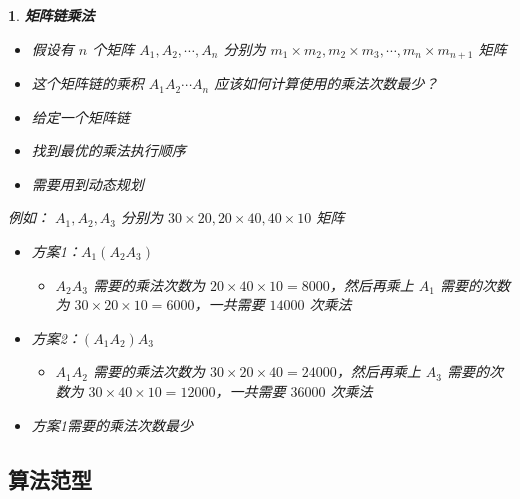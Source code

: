 \documentclass[UTF8]{report}
\theoremstyle{MyLineTheoremStyle} %
\theoremstyle{MyBlockTheoremStyle} %
\theoremstyle{MySubsubsectionStyle} %
\newtheorem{definition}{}
\begin{document}
\begin{definition}
    \textbf{矩阵链乘法}
    \begin{itemize}
        \item 假设有 $n$ 个矩阵 $A_1, A_2, \cdots, A_n$ 分别为 $m_1 × m_2, m_2 × m_3, \cdots, m_n × m_{n+1}$ 矩阵
        \item 这个矩阵链的乘积 $A_1 A_2 \cdots A_n$ 应该如何计算使用的乘法次数最少？
        \item 给定一个矩阵链
        \item 找到最优的乘法执行顺序
        \item 需要用到动态规划
    \end{itemize}

    例如： $A_1, A_2, A_3$ 分别为 $30 × 20, 20 × 40, 40 × 10$ 矩阵
    \begin{itemize}
        \item 方案1：$A_1 (A_2 A_3)$
        \begin{itemize}
            \item $A_2 A_3$ 需要的乘法次数为 $20 × 40 × 10 = 8000$，然后再乘上 $A_1$ 需要的次数为 $30 × 20 × 10 = 6000$，一共需要 $14000$ 次乘法
        \end{itemize}
        \item 方案2：$(A_1 A_2) A_3$
        \begin{itemize}
            \item $A_1 A_2$ 需要的乘法次数为 $30 × 20 × 40 = 24000$，然后再乘上 $A_3$ 需要的次数为 $30 × 40 × 10 = 12000$，一共需要 $36000$ 次乘法
        \end{itemize}
        \item 方案1需要的乘法次数最少
    \end{itemize}
\end{definition}

\subsection{算法范型}
\end{document}
